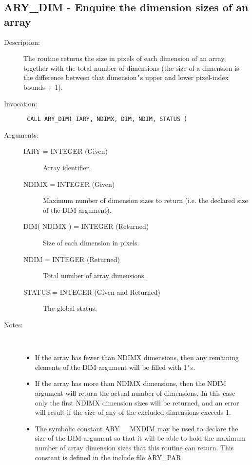 \documentclass[twoside,11pt]{article}
\newcommand{\xlabel}[1]{}
\newlength{\sstbannerlength}
\newlength{\sstcaptionlength}
\newlength{\sstexampleslength}
\newlength{\sstexampleswidth}
\newcommand{\sstroutine}[3]{
   \goodbreak
   \rule{\textwidth}{0.5mm}
   \vspace{-7ex}
   \newline
   \settowidth{\sstbannerlength}{{\Large {\bf #1}}}
   \setlength{\sstcaptionlength}{\textwidth}
   \setlength{\sstexampleslength}{\textwidth}
   \addtolength{\sstbannerlength}{0.5em}
   \addtolength{\sstcaptionlength}{-2.0\sstbannerlength}
   \addtolength{\sstcaptionlength}{-5.0pt}
   \settowidth{\sstexampleswidth}{{\bf Examples:}}
   \addtolength{\sstexampleslength}{-\sstexampleswidth}
   \parbox[t]{\sstbannerlength}{\flushleft{\Large {\bf #1}}}
   \parbox[t]{\sstcaptionlength}{\center{\Large #2}}
   \parbox[t]{\sstbannerlength}{\flushright{\Large {\bf #1}}}
   \begin{description}
      #3
   \end{description}
}
\newcommand{\sstdescription}[1]{\item[Description:] #1}
\newcommand{\sstinvocation}[1]{\item[Invocation:]\hspace{0.4em}{\tt #1}}
\newcommand{\sstarguments}[1]{
   \item[Arguments:] \mbox{} \\
   \vspace{-3.5ex}
   \begin{description}
      #1
   \end{description}
}
\newcommand{\sstsubsection}[1]{ \item[{#1}] \mbox{} \\}
\newcommand{\sstnotes}[1]{\item[Notes:] \mbox{} \\[1.3ex] #1}
\newcommand{\sstitemlist}[1]{
  \mbox{} \\
  \vspace{-3.5ex}
  \begin{itemize}
     #1
  \end{itemize}
}
\newcommand{\sstitem}{\item}
\newcommand{\ssttt}{\tt}
\renewcommand{\sstroutine}[3]{
      \subsection{#1\xlabel{#1}-\label{#1}#2}
      \begin{description}
         #3
      \end{description}
   }
\renewcommand{\sstdescription}[1]{\item[Description:]
      \begin{description}
         #1
      \end{description}
   }
\renewcommand{\sstinvocation}[1]{\item[Invocation:]
      \begin{description}
         {\ssttt #1}
      \end{description}
   }
\renewcommand{\sstarguments}[1]{
      \item[Arguments:]
      \begin{description}
         #1
      \end{description}
   }
\renewcommand{\sstsubsection}[1]{\item[{#1}]}
\renewcommand{\sstnotes}[1]{\item[Notes:]
      \begin{description}
         #1
      \end{description}
   }
\newcommand{\sstitemlist}[1]{
      \begin{itemize}
         #1
      \end{itemize}
   }
\begin{document}
\sstroutine{
   ARY\_DIM
}{
   Enquire the dimension sizes of an array
}{
   \sstdescription{
      The routine returns the size in pixels of each dimension of an
      array, together with the total number of dimensions (the size of
      a dimension is the difference between that dimension{\tt '}s upper and
      lower pixel-index bounds $+$ 1).
   }
   \sstinvocation{
      CALL ARY\_DIM( IARY, NDIMX, DIM, NDIM, STATUS )
   }
   \sstarguments{
      \sstsubsection{
         IARY = INTEGER (Given)
      }{
         Array identifier.
      }
      \sstsubsection{
         NDIMX = INTEGER (Given)
      }{
         Maximum number of dimension sizes to return (i.e. the declared
         size of the DIM argument).
      }
      \sstsubsection{
         DIM( NDIMX ) = INTEGER (Returned)
      }{
         Size of each dimension in pixels.
      }
      \sstsubsection{
         NDIM = INTEGER (Returned)
      }{
         Total number of array dimensions.
      }
      \sstsubsection{
         STATUS = INTEGER (Given and Returned)
      }{
         The global status.
      }
   }
   \sstnotes{
      \sstitemlist{

         \sstitem
         If the array has fewer than NDIMX dimensions, then any
         remaining elements of the DIM argument will be filled with 1{\tt '}s.

         \sstitem
         If the array has more than NDIMX dimensions, then the NDIM
         argument will return the actual number of dimensions. In this
         case only the first NDIMX dimension sizes will be returned, and
         an error will result if the size of any of the excluded
         dimensions exceeds 1.

         \sstitem
         The symbolic constant ARY\_\_MXDIM may be used to declare the
         size of the DIM argument so that it will be able to hold the
         maximum number of array dimension sizes that this routine can
         return. This constant is defined in the include file ARY\_PAR.
      }
   }
}
\end{document}
